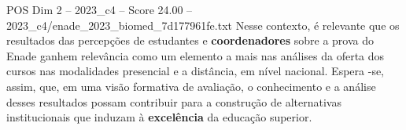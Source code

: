 \begin{textsample}{POS Dim 2 – 2023\_c4 – Score 24.00 – 2023\_c4/enade\_2023\_biomed\_7d177961fe.txt}
Nesse contexto, é relevante que os resultados das percepções de estudantes e \textbf{coordenadores} sobre a prova do Enade ganhem relevância como um elemento a mais nas análises da oferta dos cursos nas modalidades presencial e a distância, em nível nacional.
Espera -se, assim, que, em uma visão formativa de avaliação, o conhecimento e a análise desses resultados possam contribuir para a construção de alternativas institucionais que induzam à \textbf{excelência} da educação superior.

\end{textsample}
